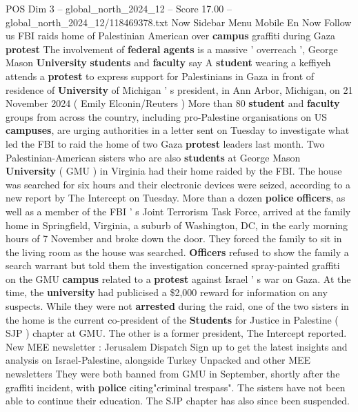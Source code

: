 \begin{textsample}{POS Dim 3 – global\_north\_2024\_12 – Score 17.00 – global\_north\_2024\_12/118469378.txt}  \label{ex:f3_pos_211}
Now Sidebar Menu Mobile En Now Follow us FBI raids home of Palestinian American over \textbf{campus} graffiti during Gaza \textbf{protest} The involvement of \textbf{federal} \textbf{agents} is a massive ' overreach ', George Mason \textbf{University} \textbf{students} and \textbf{faculty} say A \textbf{student} wearing a keffiyeh attends a \textbf{protest} to express support for Palestinians in Gaza in front of residence of \textbf{University} of Michigan ' s president, in Ann Arbor, Michigan, on 21 November 2024 ( Emily Elconin/Reuters ) More than 80 \textbf{student} and \textbf{faculty} groups from across the country, including pro-Palestine organisations on US \textbf{campuses}, are urging authorities in a letter sent on Tuesday to investigate what led the FBI to raid the home of two Gaza \textbf{protest} leaders last month.
Two Palestinian-American sisters who are also \textbf{students} at George Mason \textbf{University} ( GMU ) in Virginia had their home raided by the FBI.
The house was searched for six hours and their electronic devices were seized, according to a new report by The Intercept on Tuesday.
More than a dozen \textbf{police} \textbf{officers}, as well as a member of the FBI ' s Joint Terrorism Task Force, arrived at the family home in Springfield, Virginia, a suburb of Washington, DC, in the early morning hours of 7 November and broke down the door.
They forced the family to sit in the living room as the house was searched. \textbf{Officers} refused to show the family a search warrant but told them the investigation concerned spray-painted graffiti on the GMU \textbf{campus} related to a \textbf{protest} against Israel ' s war on Gaza.
At the time, the \textbf{university} had publicised a \$2,000 reward for information on any suspects.
While they were not \textbf{arrested} during the raid, one of the two sisters in the home is the current co-president of the \textbf{Students} for Justice in Palestine ( SJP ) chapter at GMU.
The other is a former president, The Intercept reported.
New MEE newsletter : Jerusalem Dispatch Sign up to get the latest insights and analysis on Israel-Palestine, alongside Turkey Unpacked and other MEE newsletters They were both banned from GMU in September, shortly after the graffiti incident, with \textbf{police} citing"criminal trespass".
The sisters have not been able to continue their education.
The SJP chapter has also since been suspended.

\end{textsample}
